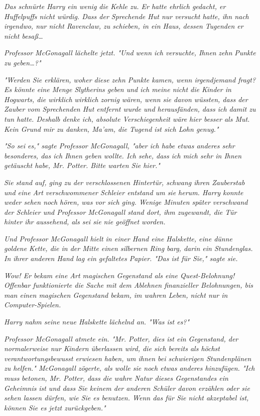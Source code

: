 {\emph{Das schnürte Harry ein wenig die Kehle zu. Er hatte ehrlich gedacht, er Huffelpuffs nicht würdig. Dass der Sprechende Hut nur versucht hatte, ihn nach irgendwo, nur nicht Ravenclaw, zu schieben, in ein Haus, dessen} \emph{Tugenden er nicht besaß…}

\emph{Professor McGonagall lächelte jetzt. "Und wenn ich versuchte, Ihnen} \emph{\emph{zehn}} \emph{Punkte zu geben…?"}

\emph{"Werden Sie erklären, woher diese zehn Punkte kamen, wenn irgendjemand fragt? Es könnte eine Menge Slytherins geben und ich meine nicht die Kinder in Hogwarts, die wirklich} \emph{\emph{wirklich}} \emph{zornig wären, wenn sie davon wüssten, dass der Zauber vom Sprechenden Hut entfernt wurde und herausfänden, dass ich damit zu tun hatte. Deshalb denke ich, absolute Verschiegenheit wäre hier besser als Mut. Kein Grund mir zu danken, Ma'am, die Tugend ist sich Lohn genug."}

\emph{"So sei es," sagte Professor McGonagall, "aber ich habe etwas anderes sehr besonderes, das ich Ihnen geben wollte. Ich sehe, dass ich mich sehr in Ihnen getäuscht habe, Mr. Potter. Bitte warten Sie hier."}

\emph{Sie stand auf, ging zu der verschlossenen Hintertür, schwang ihren Zauberstab und eine Art verschwommener Schleier entstand um sie herum. Harry konnte weder sehen noch hören, was vor sich ging. Wenige Minuten später verschwand der Schleier und Professor McGonagall stand dort, ihm zugewandt, die Tür hinter ihr aussehend, als sei sie nie geöffnet worden.}

\emph{Und Professor McGonagall hielt in einer Hand eine Halskette, eine dünne goldene Kette, die in der Mitte einen silbernen Ring barg, darin ein Stundenglas. In ihrer anderen Hand lag ein gefaltetes Papier. "Das ist für Sie," sagte sie.}

\emph{Wow! Er bekam eine Art magischen Gegenstand als eine Quest-Belohnung! Offenbar funktionierte die Sache mit dem Ablehnen finanzieller Belohnungen, bis man einen magischen Gegenstand bekam, im wahren Leben, nicht nur in Computer-Spielen.}

\emph{Harry nahm seine neue Halskette lächelnd an. "Was ist es?"}

\emph{Professor McGonagall atmete ein. "Mr. Potter, dies ist ein Gegenstand, der normalerweise nur Kindern überlassen wird, die sich bereits als höchst verantwortungsbewusst erwiesen haben, um ihnen bei schwierigen Stundenplänen zu helfen." McGonagall zögerte, als wolle sie noch etwas anderes hinzufügen. "Ich} \emph{\emph{muss}} \emph{betonen, Mr. Potter, dass die wahre Natur dieses Gegenstandes ein} \emph{\emph{Geheimnis}} \emph{ist und dass Sie keinem der anderen Schüler davon erzählen oder sie sehen lassen dürfen, wie Sie es benutzen. Wenn das für Sie nicht akzeptabel ist, können Sie es jetzt zurückgeben."}

}

